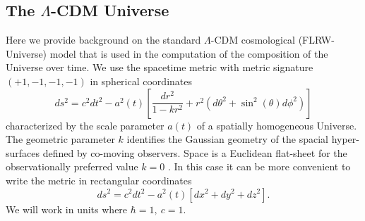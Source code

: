 \documentclass[universe,article,submit,moreauthors,pdftex,a4paper]{Definitions/mdpi}
\newcommand{\beqn}{\begin{equation}}
\newcommand{\eeqn}{\end{equation}}
\begin{document}
\subsection{The $\Lambda$-CDM Universe}\label{sec:Cosmo}
\noindent Here we provide background on the standard $\Lambda$-CDM cosmological (FLRW-Universe) model that is used in the computation of the composition of the Universe over time. We use the spacetime metric with metric signature $(+1,-1,-1,-1)$ in spherical coordinates
\beqn\label{metric}
ds^2=c^2dt^2-a^2(t)\left[ \frac{dr^2}{1-kr^2}+r^2(d\theta^2+\sin^2(\theta)d\phi^2)\right]
\eeqn
characterized  by the scale parameter $a(t)$  of a spatially homogeneous  Universe. The geometric parameter $k$ identifies the Gaussian geometry of the spacial hyper-surfaces defined by co-moving observers. Space is a Euclidean flat-sheet for the observationally preferred value $k=0$ \cite{Planck:2013pxb,Planck:2015fie,Planck:2018vyg}. In this case it can be more convenient to write the metric in rectangular coordinates
\beqn\label{metric2}
ds^2=c^2dt^2-a^2(t)\left[ dx^2+dy^2+dz^2\right].
\eeqn
We will work in units where $\hbar=1,\ c=1$.
\end{document}
